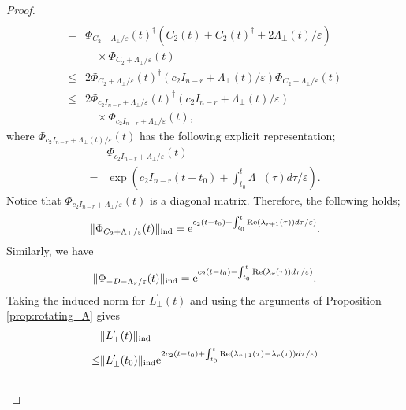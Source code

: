 \documentclass[fleqn,10pt]{SICE_FES26}
\begin{document}
\begin{proof}
\begin{align*}
	\\
	=& \Phi _{C_{2} + \Lambda _{\perp}/ \varepsilon }(t) ^{\dagger} 
	(C_{2}(t)+C_{2}(t) ^{\dagger} + 2 \Lambda _{\perp}(t)/ \varepsilon )
	 \\
	 & \quad \times \Phi _{C_{2} + \Lambda _{\perp}/ \varepsilon }(t)
	 \\
	 \leq & 
	 2 \Phi _{C_{2} + \Lambda _{\perp}/ \varepsilon }(t) ^{\dagger} 
	(c_{2} I_{n-r} +  \Lambda _{\perp}(t)/ \varepsilon )
	 \Phi _{C_{2} + \Lambda _{\perp}/ \varepsilon }(t)
	 \\
	 \leq &
	 2 \Phi _{c_{2}I_{n-r} + \Lambda _{\perp}/ \varepsilon }(t) ^{\dagger} 
	(c_{2} I_{n-r} +  \Lambda _{\perp}(t)/ \varepsilon )
	\\ & \quad \times 
	 \Phi _{c_{2}I_{n-r} + \Lambda _{\perp}/ \varepsilon }(t)
	,
	\end{align*}
	where $\Phi _{c_{2}I_{n-r} + \Lambda _{\perp}(t)/ \varepsilon }(t)$ has the following explicit representation; 
	\begin{align*}
	& \Phi _{c_{2}I_{n-r} + \Lambda _{\perp}/ \varepsilon }(t)
	\\
	=&
	\exp \left(  c_{2}I_{n-r}(t-t_{0}) + \int _{t_{0}}^{t} \Lambda _{\perp}(\tau ) d\tau / \varepsilon  \right)
	.
	\end{align*}
	Notice that $\Phi _{c_{2}I_{n-r} + \Lambda _{\perp}/ \varepsilon }(t)$ is a diagonal matrix. 
	Therefore, the following holds;
	\begin{align*}
	\| \Phi _{C_{2} + \Lambda _{\perp}/ \varepsilon }(t) \| _{\rm ind} 
	= 
	{\mathrm{e}}^{c_{2}(t-t_{0}) + \int _{t_{0}}^{t} {\mathrm{Re}}(\lambda _{r+1}(\tau )) d\tau  / \varepsilon) }.
	\end{align*}
	Similarly, we have 
	\begin{align*}
	\| \Phi _{-D -\Lambda _{r} /\varepsilon }(t) \| _{\rm ind} 
	=
	{\mathrm{e}}^{c_{2}(t-t_{0}) -\int _{t_{0}}^{t} {\mathrm{Re}} (\lambda _{r}(\tau )) d\tau  / \varepsilon) }. 
	\end{align*}
	Taking the induced norm for $L_{\perp}^{\prime}(t)$ and using the arguments of Proposition \ref{prop:rotating_A} gives 
	\begin{align*}
	& \| L_{\perp}^{\prime} (t) \| _{\rm ind}
	\\
	\leq & 
	\| L_{\perp}^{\prime}(t_{0}) \| _{\rm ind} 
	 {\mathrm{e}}^{2c_{2}(t-t_{0}) + \int _{t_{0}}^{t} {\mathrm{Re}}( \lambda _{r+1}(\tau ) - \lambda _{r}(\tau ) )d\tau  / \varepsilon) }
	\\ &

\end{align*}
\end{proof}
\end{document}
